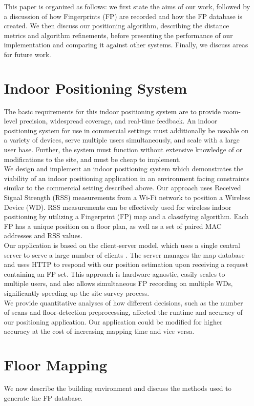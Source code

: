 \documentclass[conference]{IEEEtran}
\begin{document}
\indent This paper is organized as follows: we first state the aims of our work, followed by a discussion of how Fingerprints (FP) are recorded and how the FP database is created. We then discuss our positioning algorithm, describing the distance metrics and algorithm refinements, before presenting the performance of our implementation and comparing it against other systems. Finally, we discuss areas for future work.

\section{Indoor Positioning System}
The basic requirements for this indoor positioning system are to provide room-level precision, widespread coverage, and real-time feedback. An indoor positioning system for use in commercial settings must additionally be useable on a variety of devices, serve multiple users simultaneously, and scale with a large user base. Further, the system must function without extensive knowledge of or modifications to the site, and must be cheap to implement. \\
\indent We design and implement an indoor positioning system which demonstrates the viability of an indoor positioning application in an environment facing constraints similar to the commercial setting described above. Our approach uses Received Signal Strength (RSS) measurements from a Wi-Fi network to position a Wireless Device (WD). RSS measurements can be effectively used for wireless indoor positioning by utilizing a Fingerprint (FP) map and a classifying algorithm. Each FP has a unique position on a floor plan, as well as a set of paired MAC addresses and RSS values.\\
\indent Our application is based on the client-server model, which uses a single central server to serve a large number of clients \cite{Fielding}. The server manages the map database and uses HTTP to respond with our position estimation upon receiving a request containing an FP set. This approach is hardware-agnostic, easily scales to multiple users, and also allows simultaneous FP recording on multiple WDs, significantly speeding up the site-survey process.\\ 
\indent We provide quantitative analyses of how different decisions, such as the number of scans and floor-detection preprocessing, affected the runtime and accuracy of our positioning application. Our application could be modified for higher accuracy at the cost of increasing mapping time and vice versa.
\section{Floor Mapping}
We now describe the building environment and discuss the methods used to generate the FP database.
\end{document}
